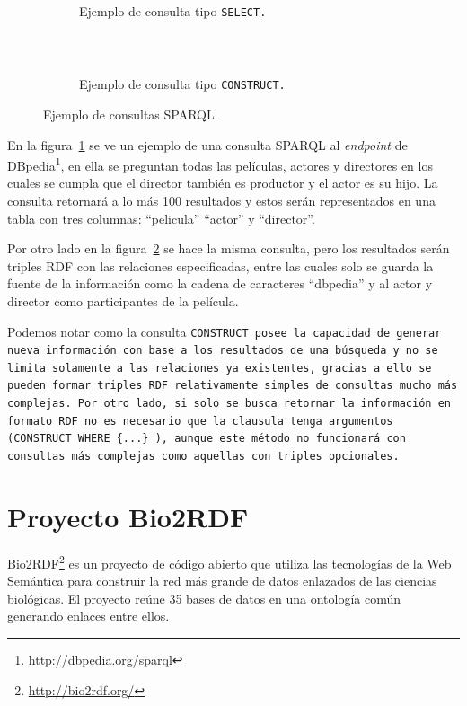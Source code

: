 \begin{figure}[htpb]
  \centering
  \begin{subfigure}[b]{\textwidth}
    \centering
    \begin{tabular}{c}
      
    \end{tabular}
    \caption{Ejemplo de consulta tipo \tt{SELECT}.}
    \label{fig:sparql:select}
  \end{subfigure}
  \\[0.5cm]
  \begin{subfigure}[b]{\textwidth}
    \centering
    \begin{tabular}{c}
      
    \end{tabular}
    \caption{Ejemplo de consulta tipo \tt{CONSTRUCT}.}
    \label{fig:sparql:construct}
  \end{subfigure}
  \caption{Ejemplo de consultas SPARQL.}\label{fig:sparql}
\end{figure}

En la figura~\ref{fig:sparql:select} se ve un ejemplo de una consulta SPARQL al
\emph{endpoint} de DBpedia\footnote{\url{http://dbpedia.org/sparql}}, en ella se
preguntan todas las películas, actores y directores en los cuales se cumpla que
el director también es productor y el actor es su hijo. La consulta retornará a
lo más 100 resultados y estos serán representados en una tabla con tres
columnas: ``pelicula'' ``actor'' y ``director''.

Por otro lado en la figura~\ref{fig:sparql:construct} se hace la misma consulta,
pero los resultados serán triples RDF con las relaciones especificadas, entre
las cuales solo se guarda la fuente de la información como la cadena de
caracteres ``dbpedia'' y al actor y director como participantes de la película.

Podemos notar como la consulta \tt{CONSTRUCT} posee la capacidad de generar
nueva información con base a los resultados de una búsqueda y no se limita
solamente a las relaciones ya existentes, gracias a ello se pueden formar
triples RDF relativamente simples de consultas mucho más complejas. Por otro
lado, si solo se busca retornar la información en formato RDF no es necesario
que la clausula tenga argumentos (\tt{CONSTRUCT WHERE \{...\}} ), aunque este
método no funcionará con consultas más complejas como aquellas con triples
opcionales.

\section{Proyecto Bio2RDF}\label{ea:bio}
Bio2RDF\hspace{0.5mm}\footnote{\url{http://bio2rdf.org/}}
\cite{belleau2008bio2rdf,callahan2013bio2rdf} es un proyecto de código
abierto que utiliza las tecnologías de la Web Semántica para construir la
red más grande de datos enlazados de las ciencias biológicas.
El proyecto reúne 35 bases de datos en una ontología común generando enlaces
entre ellos.

